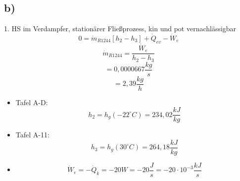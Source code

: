 

\subsection*{b)}
1. HS im Verdampfer, stationärer Fließprozess, kin und pot vernachlässigbar \\
\[
0 = \dot{m}_{R1244} \left[ h_2 - h_3 \right] + \dot{Q}_{ev} - \dot{W}_e
\]
\[
\dot{m}_{R1244} = \frac{\dot{W}_e}{h_2 - h_3}
\]
\[
= 0{,}0000667 \frac{kg}{s}
\]
\[
= 2{,}39 \frac{kg}{h}
\]

\begin{itemize}
    \item Tafel A-D:
    \[
    h_2 = h_g (-22^\circ C) = 234{,}02 \frac{kJ}{kg}
    \]
    \item Tafel A-11:
    \[
    h_3 = h_g (30^\circ C) = 264{,}18 \frac{kJ}{kg}
    \]
    \item 
    \[
    \dot{W}_e = -\dot{Q}_{k} = -20 W = -20 \frac{J}{s} = -20 \cdot 10^{-3} \frac{kJ}{s}
    \]
\end{itemize}